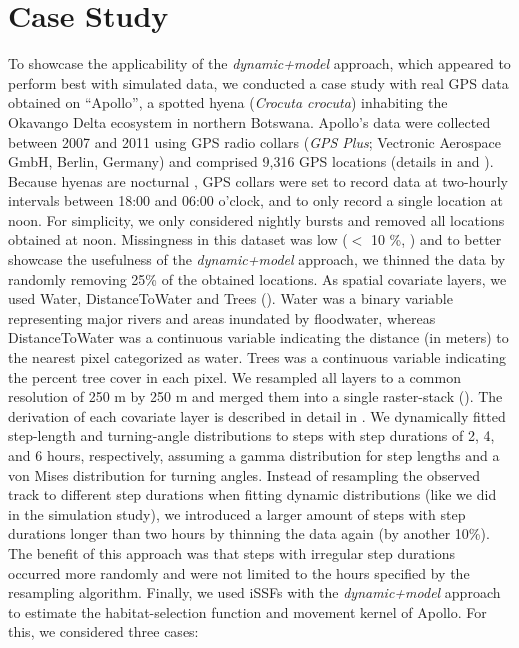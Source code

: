 \documentclass[../FinalThesis.tex]{subfiles}
\begin{document}
\section{Case Study}

To showcase the applicability of the \textit{dynamic+model} approach, which
appeared to perform best with simulated data, we conducted a case study with
real GPS data obtained on ``Apollo'', a spotted hyena (\textit{Crocuta crocuta})
inhabiting the Okavango Delta ecosystem in northern Botswana. Apollo's data were
collected between 2007 and 2011 using GPS radio collars (\textit{GPS Plus};
Vectronic Aerospace GmbH, Berlin, Germany) and comprised 9,316 GPS locations
(details in \citealp{Cozzi.2013a} and \citealp{Cozzi.2015}). Because hyenas are
nocturnal \citep{Cozzi.2012}, GPS collars were set to record data at two-hourly
intervals between 18:00 and 06:00 o'clock, and to only record a single location
at noon. For simplicity, we only considered nightly bursts and removed all
locations obtained at noon. Missingness in this dataset was low ($<$ 10 \%,
\citealp{Cozzi.2015}) and to better showcase the usefulness of the
\textit{dynamic+model} approach, we thinned the data by randomly removing 25\%
of the obtained locations. As spatial covariate layers, we used \textsf{Water},
\textsf{DistanceToWater} and \textsf{Trees} ().
\textsf{Water} was a binary variable representing major rivers and areas
inundated by floodwater, whereas \textsf{DistanceToWater} was a continuous
variable indicating the distance (in meters) to the nearest pixel categorized as
water. \textsf{Trees} was a continuous variable indicating the percent tree
cover in each pixel. We resampled all layers to a common resolution of 250 m by
250 m and merged them into a single raster-stack ().
The derivation of each covariate layer is described in detail in
\citealp{Hofmann.2021}. We dynamically fitted step-length and turning-angle
distributions to steps with step durations of 2, 4, and 6 hours, respectively,
assuming a gamma distribution for step lengths and a von Mises distribution for
turning angles. Instead of resampling the observed track to different step
durations when fitting dynamic distributions (like we did in the simulation
study), we introduced a larger amount of steps with step durations longer than
two hours by thinning the data again (by another 10\%). The benefit of this
approach was that steps with irregular step durations occurred more randomly and
were not limited to the hours specified by the resampling algorithm. Finally, we
used iSSFs with the \textit{dynamic+model} approach to estimate the
habitat-selection function and movement kernel of Apollo. For this, we
considered three cases:
\end{document}
